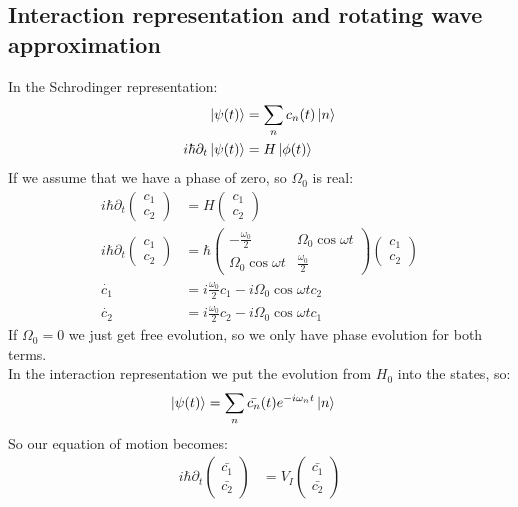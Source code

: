 \subsection{Interaction representation and rotating wave approximation}
In the Schrodinger representation:
\begin{align*}
	\ket{\psi(t)} &= \sum_n c_n(t) \ket{n} \\
	i\hbar \partial_t \ket{\psi(t)} &= H\ket{\phi(t)}
\end{align*}
If we assume that we have a phase of zero, so $\Omega_0$ is real:
\begin{align*}
	i\hbar \partial_t \begin{pmatrix}c_1 \\ c_2\end{pmatrix} &= H \begin{pmatrix}c_1 \\ c_2\end{pmatrix} \\
	i\hbar \partial_t \begin{pmatrix}c_1 \\ c_2\end{pmatrix} &= \hbar \begin{pmatrix} -\frac{\omega_0}{2} & \Omega_0 \cos\omega t \\ \Omega_0\cos\omega t & \frac{\omega_0}{2}\end{pmatrix} \begin{pmatrix}c_1 \\ c_2\end{pmatrix} \\
	\dot{c_1} &= i \frac{\omega_0}{2} c_1 - i\Omega_0\cos\omega t c_2 \\
	\dot{c_2} &= i \frac{\omega_0}{2} c_2 - i\Omega_0\cos\omega t c_1
\end{align*}
If $\Omega_0 = 0$ we just get free evolution, so we only have phase evolution for both terms. \\
In the interaction representation we put the evolution from $H_0$ into the states, so:
\begin{align*}
	\ket{\psi(t)} &= \sum_n \bar{c_n}(t) e^{-i \omega_n t} \ket{n}
\end{align*}
So our equation of motion becomes:
\begin{align*}
	i \hbar \partial_t \begin{pmatrix}\bar{c_1} \\ \bar{c_2} \end{pmatrix} &= V_I \begin{pmatrix}\bar{c_1} \\ \bar{c_2}\end{pmatrix}
\end{align*}
